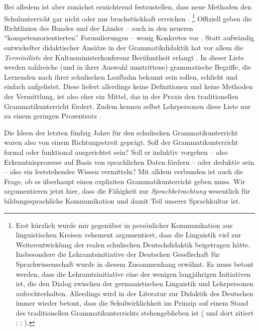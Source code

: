 Bei alledem ist aber zunächst ernüchternd festzustellen, dass neue Methoden den Schulunterricht gar nicht oder nur bruchstückhaft erreichen \citep[243]{Bredel2013}.%
\footnote{Erst kürzlich wurde mir gegenüber in persönlicher Kommunikation aus linguistischen Kreisen vehement argumentiert, dass die Linguistik viel zur Weiterentwicklung der realen schulischen Deutschdidaktik beigetragen hätte.
Insbesondere die Lehramtsinitiative der Deutschen Gesellschaft für Sprachwissenschaft wurde in diesem Zusammenhang erwähnt.
Es muss betont werden, dass die Lehramtsinitiative eine der wenigen langjährigen Initiativen ist, die den Dialog zwischen der germanistischen Linguistik und Lehrpersonen aufrechterhalten.
Allerdings wird in der Literatur zur Didaktik des Deutschen immer wieder betont, dass die Schulwirklichkeit im Prinzip auf einem Stand des traditionellen Grammatikunterrichts stehengeblieben ist (\zB \citealt[211]{Steets2003} und dort zitiert \citealt[143]{SteinigHuneke2002}; \citealt[243,257]{Bredel2013}; \citealt[2]{KoepckeZiegler2013}).}
Offiziell geben die Richtlinien des Bundes und der Länder -- auch in den neueren "`kompetenzorientierten"' Formulierungen -- wenig Konkretes vor \citep[250--255]{Bredel2013}.
Statt aufwändig entwickelter didaktischer Ansätze in der Grammatikdidaktik hat vor allem die \textit{Terminiliste} der Kultusministerkonferenz Berühmtheit erlangt \citep[244--249]{Bredel2013}.
In dieser Liste werden zahlreiche (und in ihrer Auswahl umstrittene) grammatische Begriffe, die Lernenden nach ihrer schulischen Laufbahn bekannt sein sollen, schlicht und einfach aufgelistet.
Diese liefert allerdings keine Definitionen und keine Methoden der Vermittlung, ist also eher ein Mittel, das in der Praxis den traditionellen Grammatikunterricht fördert.
Zudem kennen selbst Lehrpersonen diese Liste nur zu einem geringen Prozentsatz \citep{Haecker2009}.

Die Ideen der letzten fünfzig Jahre für den schulischen Grammatikunterricht waren also von einem Richtungsstreit geprägt.
Soll der Grammatikunterricht formal oder funktional ausgerichtet sein?
Soll er induktiv vorgehen -- also Erkenntnisprozesse auf Basis von sprachlichen Daten fördern -- oder deduktiv sein -- also ein feststehendes Wissen vermitteln?
Mit alldem verbunden ist auch die Frage, ob es überhaupt einen expliziten Grammatikunterricht geben muss.
Wir argumentieren jetzt hier, dass die Fähigkeit zur \textit{Sprachbetrachtung} wesentlich für bildungssprachliche Kommunikation und damit Teil unserer Sprachkultur ist.

